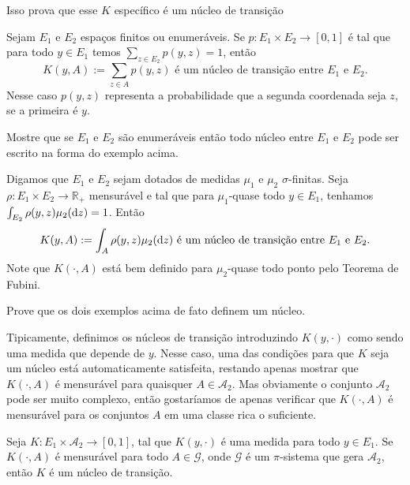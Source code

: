 Isso prova que esse $K$ específico é um núcleo de transição

\begin{example}
  \label{x:nucleo_discreto}
  Sejam $E_1$ e $E_2$ espaços finitos ou enumeráveis.
  Se $p: E_1 \times E_2 \to [0,1]$ é tal que para todo $y \in E_1$ temos $\sum_{z\in E_2} p(y, z) = 1$, então
  \begin{equation}
    K(y, A) := \sum_{z \in A} p(y, z) \text{ é um núcleo de transição entre $E_1$ e $E_2$.}
  \end{equation}
  Nesse caso $p(y,z)$ representa a probabilidade que a segunda coordenada seja $z$, se a primeira é $y$.
\end{example}

\begin{exercise}
  Mostre que se $E_1$ e $E_2$ são enumeráveis então todo núcleo entre $E_1$ e $E_2$ pode ser escrito na forma do exemplo acima.
\end{exercise}

\begin{example}
  Digamos que $E_1$ e $E_2$ sejam dotados de medidas $\mu_1$ e $\mu_2$ $\sigma$-finitas.
  Seja $\rho: E_1 \times E_2 \to \mathbb{R}_+$ mensurável e tal que para $\mu_1$-quase todo $y \in E_1$, tenhamos $\int_{E_2} \rho(y, z) \mu_2(\mathop{}\!\mathrm{d} z) = 1$.
  Então
  \begin{equation}
    K(y, A) := \int_A \rho(y, z) \mu_2(\mathop{}\!\mathrm{d} z) \text{ é um núcleo de transição entre $E_1$ e $E_2$.}
  \end{equation}
  Note que $K(\cdot, A)$ está bem definido para $\mu_2$-quase todo ponto pelo Teorema de Fubini.
\end{example}

\begin{exercise}
  Prove que os dois exemplos acima de fato definem um núcleo.
\end{exercise}

Tipicamente, definimos os núcleos de transição introduzindo $K(y, \cdot)$ como sendo uma medida que depende de $y$.
Nesse caso, uma das condições para que $K$ seja um núcleo está automaticamente satisfeita, restando apenas mostrar que $K(\cdot, A)$ é mensurável para quaisquer $A \in \mathcal{A}_2$.
Mas obviamente o conjunto $\mathcal{A}_2$ pode ser muito complexo, então gostaríamos de apenas verificar que $K(\cdot, A)$ é mensurável para os conjuntos $A$ em uma classe rica o suficiente.

\begin{proposition}
  \label{p:K_nucleo_na_classe}
  Seja $K:E_1 \times \mathcal{A}_2 \to [0,1]$, tal que $K(y, \cdot)$ é uma medida para todo $y \in E_1$.
  Se $K(\cdot, A)$ é mensurável para todo $A \in \mathcal{G}$, onde $\mathcal{G}$ é um $\pi$-sistema que gera $\mathcal{A}_2$, então $K$ é um núcleo de transição.
\end{proposition}

